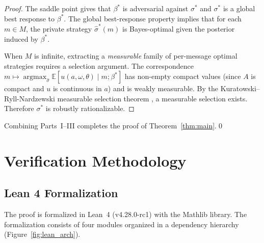 \documentclass[11pt,a4paper]{article}
\theoremstyle{definition}
\newcommand{\E}{\mathbb{E}}
\DeclareMathOperator*{\argmax}{argmax}
\begin{document}
\begin{proof}
The saddle point gives that $\beta^*$ is adversarial against $\sigma^*$ and $\sigma^*$ is a global best response to $\beta^*$.
The global best-response property implies that for each $m\in M$, the private strategy $\hat{\sigma}^*(m)$ is Bayes-optimal given the posterior induced by $\beta^*$.

When $M$ is infinite, extracting a \emph{measurable} family of per-message optimal strategies requires a selection argument.
The correspondence $m\mapsto\argmax_{\hat{\sigma}}\E[u(a,\omega,\theta)\mid m;\beta^*]$ has non-empty compact values (since $A$ is compact and $u$ is continuous in $a$) and is weakly measurable.
By the Kuratowski--Ryll-Nardzewski measurable selection theorem \citep{kuratowski1965general}, a measurable selection exists.
Therefore $\sigma^*$ is robustly rationalizable.
\end{proof}

Combining Parts~I--III completes the proof of Theorem~\ref{thm:main}.\qed

\section{Verification Methodology}
\label{sec:setup}

\subsection{Lean 4 Formalization}

The proof is formalized in Lean~4 (v4.28.0-rc1) with the Mathlib library.
The formalization consists of four modules organized in a dependency hierarchy (Figure~\ref{fig:lean_arch}).
\end{document}
